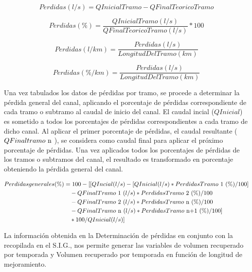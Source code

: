 \documentclass[]{article}
\begin{document}
\begin{equation}
Perdidas (l/s) = Q Inicial Tramo - Q Final Teorico Tramo 
\end{equation}

\begin{equation}
Perdidas (\%) = \frac{Q Inicial Tramo (l/s)}{ Q Final Teorico Tramo (l/s)} * 100
\end{equation}

\begin{equation}
Perdidas (l/km) = \frac{Perdidas (l/s)}{Longitud Del Tramo (km)}
\end{equation}

\begin{equation}
Perdidas (\%/km) = \frac{Perdidas (l/s)}{Longitud Del Tramo (km)}
\end{equation}

Una vez tabulados los datos de pérdidas por tramo, se procede a determinar la pérdida general del canal, aplicando el porcentaje de pérdidas correspondiente de cada tramo o subtramo al caudal de inicio del canal. El caudal incial ($QInicial$) es sometido a todos los porcentajes de pérdidas correspondientes a cada tramo de dicho canal. Al aplicar el primer porcentaje de pérdidas, el caudal resultante ($QFinaltramo \textup{ n }$), se considera como caudal final para aplicar el próximo porcentaje de pérdidas. Una vez aplicados todos los porcentajes de pérdidas de los tramos o subtramos del canal, el resultado es transformado en porcentaje obteniendo la pérdida general del canal.

\begin{equation}
 \begin{split}
	Perdidas generales(\%) & = 100-[[Q Incial (l/s) - [Q Inicial (l/s) * Perdidas Tramo \textup{ 1 } (\%)/100]\\
	&\quad - Q Final Tramo \textup{ 1 } (l/s) * Perdidas Tramo \textup{ 2 } (\%)/100\\
	&\quad - Q Final Tramo \textup{ 2 } (l/s) * Perdidas Tramo \textup{ n } (\%)/100 \\
	&\quad - Q Final Tramo \textup{ n } (l/s) * Perdidas Tramo \textup{ n+1 } (\%)/100]\\
	&\quad * 100 / Q Inicial (l/s)]
 \end{split}
\end{equation}

La información obtenida en la Determinación de pérdidas en conjunto con la recopilada en el S.I.G., nos permite generar las variables de volumen recuperado por temporada y Volumen recuperado por temporada en función de longitud de mejoramiento.
\end{document}
